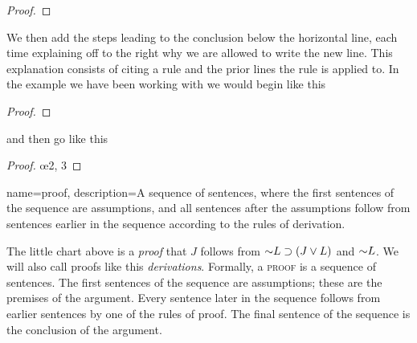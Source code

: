 \begin{proof}
	 			
\end{proof}

We then add the steps leading to the conclusion below the horizontal line, each time explaining off to the right why we are allowed to write the new line. This explanation consists of citing a rule and the prior lines the rule is applied to. In the example we have been working with we would begin like this

\begin{proof}
	 
	 
\end{proof}

and then go like this

\begin{proof}
	 
	 
	 \oe{2, 3}
\end{proof}

{
name=proof,
description={A sequence of sentences, where the first sentences of the sequence are assumptions, and all sentences after the assumptions follow from sentences earlier in the sequence according to the rules of derivation.}
}



The little chart above is a \emph{proof} that $J$ follows from $\mathord{\sim} L \supset (J \vee L)$ and $\mathord{\sim} L$. We will also call proofs like this \emph{derivations}. Formally, a \textsc{\gls{proof}}\label{def:proof} is a sequence of sentences. The first sentences of the sequence are assumptions; these are the premises of the argument. Every sentence later in the sequence follows from earlier sentences by one of the rules of proof. The final sentence of the sequence is the conclusion of the argument.




